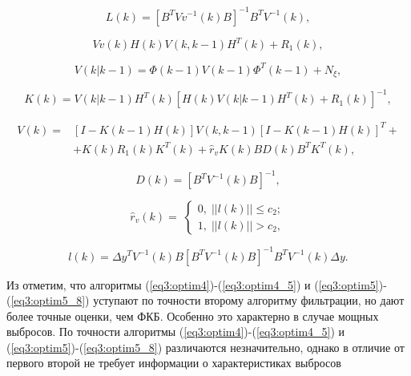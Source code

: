 \begin{equation}\label{eq3:optim5_1}
L(k)=[B^TVv^{-1}(k)B]^{-1}B^TV^{-1}(k),
\end{equation}

\begin{equation}\label{eq3:optim5_2}
Vv(k)H(k)V(k,k-1)H^T(k)+R_1(k),
\end{equation}

\begin{equation}\label{eq3:optim5_3}
V(k|k-1)=\Phi(k-1)V(k-1)\Phi^T(k-1)+N_\xi,
\end{equation}

\begin{equation}\label{eq3:optim5_4}
K(k)=V(k|k-1)H^T(k)[H(k)V(k|k-1)H^T(k)+R_1(k)]^{-1},
\end{equation}

\begin{equation}\label{eq3:optim5_5}
\begin{split}
V(k)=&[I-K(k-1)H(k)]V(k,k-1)[I-K(k-1)H(k)]^T+\\
&+K(k)R_1(k)K^T(k)+\hat{r}_vK(k)BD(k)B^TK^T(k),
\end{split}
\end{equation}

\begin{equation}\label{eq3:optim5_6}
D(k)=[B^TV^{-1}(k)B]^{-1},
\end{equation}

\begin{equation}\label{eq3:optim5_7}
\hat{r}_v(k)= \;
\begin{cases}
0, \; ||l(k)||\leq c_2; \\    
1, \; ||l(k)||> c_2,    
\end{cases}
\end{equation}

\begin{equation}\label{eq3:optim5_8}
l(k)=\Delta y^TV^{-1}(k)B[B^TV^{-1}(k)B]^{-1}B^TV^{-1}(k)\Delta y.
\end{equation}

Из \cite{Klekis} отметим, что алгоритмы (\ref{eq3:optim4})-(\ref{eq3:optim4_5}) и (\ref{eq3:optim5})-(\ref{eq3:optim5_8}) уступают по точности второму алгоритму фильтрации, но дают более точные оценки, чем ФКБ.
Особенно это характерно в случае мощных выбросов.
По точности алгоритмы (\ref{eq3:optim4})-(\ref{eq3:optim4_5}) и (\ref{eq3:optim5})-(\ref{eq3:optim5_8}) различаются незначительно, однако в отличие от первого второй не требует информации о характеристиках выбросов

